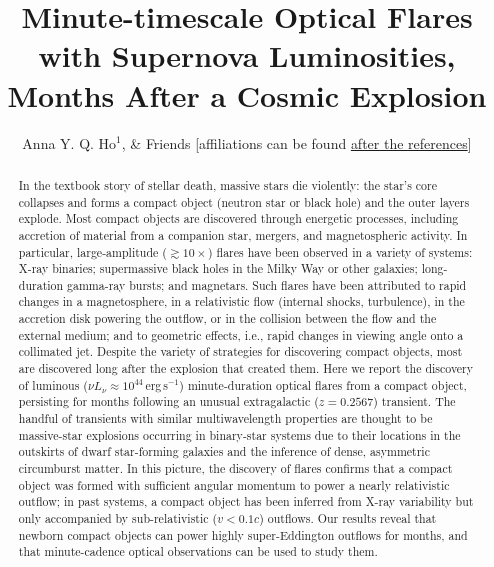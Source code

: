 \documentclass{nature_plusfigure}
\title{Minute-timescale Optical Flares with Supernova Luminosities, Months After a Cosmic Explosion}
\author{Anna Y. Q. Ho$^{1}$,
\& Friends
[affiliations can be found \hyperref[sec:affiliations]{after the references}]
	}
\begin{document}
\maketitle

\begin{abstract}

In the textbook story of stellar death, massive stars die violently: the star's core collapses and forms a compact object (neutron star or black hole) and the outer layers explode.
Most compact objects are discovered through energetic processes, including accretion of material from a companion star, mergers, and magnetospheric activity.
In particular, large-amplitude ($\gtrsim10\times$) flares have been observed in a variety of systems: X-ray binaries\cite{Fender1997}; supermassive black holes in the Milky Way\cite{Marrone2008} or other galaxies\cite{Nesci2021}; long-duration gamma-ray bursts\cite{Racusin2008}; and magnetars\cite{Kaspi2017}. 
Such flares have been attributed to rapid changes in a magnetosphere, in a relativistic flow (internal shocks, turbulence), in the accretion disk powering the outflow, or in the collision between the flow and the external medium; and to geometric effects, i.e., rapid changes in viewing angle onto a collimated jet. 
Despite the variety of strategies for discovering compact objects, most are discovered long after the explosion that created them.
Here we report the discovery of luminous ($\nu L_\nu \approx 10^{44}\,$erg\,s$^{-1}$) minute-duration optical flares from a compact object, persisting for months following an unusual extragalactic ($z=0.2567$) transient.
The handful of transients with similar multiwavelength properties are thought to be massive-star explosions\cite{Perley2019,Margutti2019} occurring in binary-star systems\cite{Metzger2022} due to their locations in the outskirts of dwarf star-forming galaxies and the inference of dense\cite{Ho2019,Coppejans2020}, asymmetric\cite{Margutti2019,Maund2023} circumburst matter.
In this picture, the discovery of flares confirms that a compact object was formed with sufficient angular momentum to power a nearly relativistic outflow; in past systems, a compact object has been inferred from X-ray variability\cite{Margutti2019,Ho2019,Pasham2021,Yao2022} but only accompanied by sub-relativistic ($v<0.1c$) outflows.
Our results reveal that newborn compact objects can power highly super-Eddington outflows for months, and that minute-cadence optical observations can be used to study them.

\end{abstract}
\end{document}
